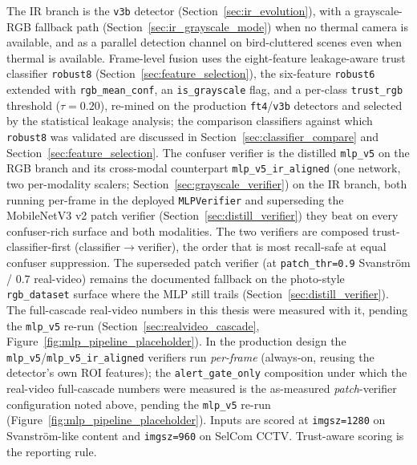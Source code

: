 The IR branch is the \texttt{v3b} detector (Section~\ref{sec:ir_evolution}), with a grayscale-RGB fallback path (Section~\ref{sec:ir_grayscale_mode}) when no thermal camera is available, and as a parallel detection channel on bird-cluttered scenes even when thermal is available. Frame-level fusion uses the eight-feature leakage-aware trust classifier \texttt{robust8} (Section~\ref{sec:feature_selection}), the six-feature \texttt{robust6} extended with \texttt{rgb\_mean\_conf}, an \texttt{is\_grayscale} flag, and a per-class \texttt{trust\_rgb} threshold ($\tau{=}0.20$), re-mined on the production \texttt{ft4}/\texttt{v3b} detectors and selected by the statistical leakage analysis; the comparison classifiers against which \texttt{robust8} was validated are discussed in Section~\ref{sec:classifier_compare} and Section~\ref{sec:feature_selection}. The confuser verifier is the distilled \texttt{mlp\_v5} on the RGB branch and its cross-modal counterpart \texttt{mlp\_v5\_ir\_aligned} (one network, two per-modality scalers; Section~\ref{sec:grayscale_verifier}) on the IR branch, both running per-frame in the deployed \texttt{MLPVerifier} and superseding the MobileNetV3 v2 patch verifier (Section~\ref{sec:distill_verifier}) they beat on every confuser-rich surface and both modalities. The two verifiers are composed trust-classifier-first (classifier$\to$verifier), the order that is most recall-safe at equal confuser suppression. The superseded patch verifier (at \texttt{patch\_thr=0.9} Svanstr\"om / $0.7$ real-video) remains the documented fallback on the photo-style \texttt{rgb\_dataset} surface where the MLP still trails (Section~\ref{sec:distill_verifier}). The full-cascade real-video numbers in this thesis were measured with it, pending the \texttt{mlp\_v5} re-run (Section~\ref{sec:realvideo_cascade}, Figure~\ref{fig:mlp_pipeline_placeholder}). In the production design the \texttt{mlp\_v5}/\texttt{mlp\_v5\_ir\_aligned} verifiers run \emph{per-frame} (always-on, reusing the detector's own ROI features); the \texttt{alert\_gate\_only} composition under which the real-video full-cascade numbers were measured is the as-measured \emph{patch}-verifier configuration noted above, pending the \texttt{mlp\_v5} re-run (Figure~\ref{fig:mlp_pipeline_placeholder}). Inputs are scored at \texttt{imgsz=1280} on Svanstr\"om-like content and \texttt{imgsz=960} on SelCom CCTV. Trust-aware scoring is the reporting rule.

